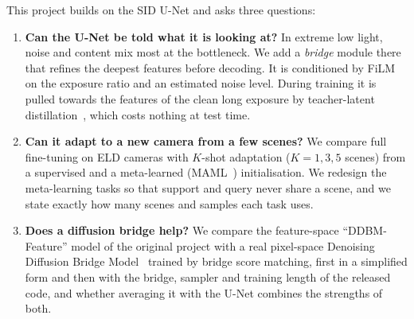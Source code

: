 This project builds on the SID U-Net and asks three questions:
\begin{enumerate}
\item \textbf{Can the U-Net be told what it is looking at?} In extreme low light, noise and content mix most at the bottleneck. We add a \emph{bridge} module there that refines the deepest features before decoding. It is conditioned by FiLM~\cite{perez2018film} on the exposure ratio and an estimated noise level. During training it is pulled towards the features of the clean long exposure by teacher-latent distillation~\cite{romero2015fitnets}, which costs nothing at test time.
\item \textbf{Can it adapt to a new camera from a few scenes?} We compare full fine-tuning on ELD cameras with $K$-shot adaptation ($K=1,3,5$ scenes) from a supervised and a meta-learned (MAML~\cite{finn2017maml}) initialisation. We redesign the meta-learning tasks so that support and query never share a scene, and we state exactly how many scenes and samples each task uses.
\item \textbf{Does a diffusion bridge help?} We compare the feature-space ``DDBM-Feature'' model of the original project with a real pixel-space Denoising Diffusion Bridge Model~\cite{zhou2024ddbm} trained by bridge score matching, first in a simplified form and then with the bridge, sampler and training length of the released code, and whether averaging it with the U-Net combines the strengths of both.
\end{enumerate}

